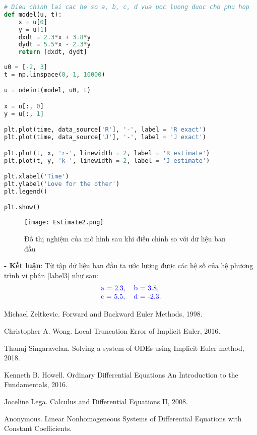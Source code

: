 \documentclass[a4paper]{article}
\begin{document}
\begin{lstlisting}[language=Python]
# Dieu chinh lai cac he so a, b, c, d vua uoc luong duoc cho phu hop
def model(u, t):
    x = u[0]
    y = u[1]
    dxdt = 2.3*x + 3.8*y
    dydt = 5.5*x - 2.3*y
    return [dxdt, dydt]
 
u0 = [-2, 3]
t = np.linspace(0, 1, 10000)

u = odeint(model, u0, t)

x = u[:, 0]
y = u[:, 1]

plt.plot(time, data_source['R'], '-', label = 'R exact')
plt.plot(time, data_source['J'], '-', label = 'J exact')

plt.plot(t, x, 'r-', linewidth = 2, label = 'R estimate')
plt.plot(t, y, 'k-', linewidth = 2, label = 'J estimate')

plt.xlabel('Time')
plt.ylabel('Love for the other')
plt.legend()

plt.show()

\end{lstlisting}

    \begin{figure}[!htp]
        \centering
        \texttt{[image: Estimate2.png]}
        \caption{Đồ thị nghiệm của mô hình sau khi điều chỉnh so với dữ liệu ban đầu} 
    \end{figure}

{\bfseries - Kết luận}: Từ tập dữ liệu ban đầu ta ước lượng được các hệ số của hệ phương trình vi phân \eqref{label3} như sau:
    \begin{align*}
    \textcolor{blue}{
    \begin{tabular}{ll}
         a = 2.3, & b = 3.8,\\
         c = 5.5, & d = -2.3.
    \end{tabular}}
    \end{align*}
    
\newpage
    
\begin{thebibliography}{80}

\bibitem[MZ98]{}
Michael Zeltkevic. Forward and Backward Euler Methods, 1998.

\bibitem[CAW16]{}
Christopher A. Wong. Local Truncation Error of Implicit Euler, 2016.

\bibitem[TS18]{} 
Thanuj Singaravelan. Solving a system of ODEs using Implicit Euler method, 2018.

\bibitem[KBH16]{}
Kenneth B. Howell. Ordinary Differential Equations An Introduction to the \\Fundamentals, 2016.

\bibitem[JL08]{}
Joceline Lega. Calculus and Differential Equations II, 2008.

\bibitem[LNS]{}
Anonymous. Linear Nonhomogeneous Systems of Differential Equations with Constant Coefficients.

\end{thebibliography}
\end{document}
